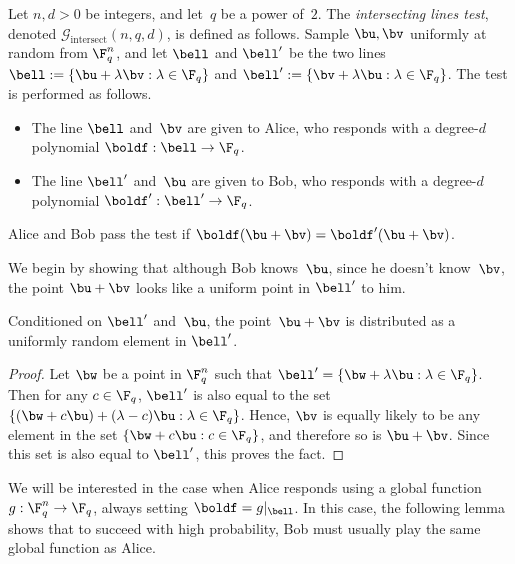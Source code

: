 \documentclass[11pt]{article}
\newcommand{\game}{\mathscr{G}}
\begin{document}
\begin{definition}
Let $n, d > 0$ be integers, and let~$q$ be a power of~$2$.
The \emph{intersecting lines test}, denoted $\game_{\mathrm{intersect}}(n, q, d)$, is defined as follows.
Sample $\bu, \bv$ uniformly at random from $\F_q^n$,
and let $\bell$ and $\bell'$ be the two lines
$\bell := \{\bu + \lambda \bv : \lambda \in \F_q\}$
and $\bell' := \{\bv + \lambda \bu : \lambda \in \F_q\}$.
The test is performed as follows.
\begin{itemize}
\itemsep -.5pt
\item[$\circ$] The line $\bell$ and~$\bv$ are given to Alice, who responds with a degree-$d$ polynomial $\boldf: \bell \rightarrow \F_q$.
\item[$\circ$] The line $\bell'$ and~$\bu$ are given to Bob, who responds with a degree-$d$ polynomial $\boldf':\bell' \rightarrow  \F_q$.
\end{itemize}
Alice and Bob pass the test if $\boldf(\bu + \bv) = \boldf'(\bu + \bv)$.
\end{definition}

We begin by showing that although Bob knows~$\bu$, since he doesn't know~$\bv$,
the point $\bu + \bv$ looks like a uniform point in $\bell'$ to him.

\begin{fact}\label{fact:easy-peasy-lemon-peasy}
Conditioned on $\bell'$ and~$\bu$, the point~$\bu+\bv$ is distributed as a uniformly random element in $\bell'$.
\end{fact}
\begin{proof}
Let $\bw$ be a point in $\F_q^n$ such that $\bell' = \{\bw + \lambda \bu : \lambda \in \F_q\}$. 
Then for any $c \in \F_q$, $\bell'$ is also equal to the set
$\{(\bw + c\bu) + (\lambda-c) \bu : \lambda \in \F_q\}$.
Hence, $\bv$ is equally likely to be any element in the set $\{\bw + c \bu : c \in \F_q\}$,
and therefore so is $\bu + \bv$.
Since this set is also equal to $\bell'$, this proves the fact.
\end{proof}

We will be interested in the case when Alice responds using a global function~$g:\F_q^n \rightarrow \F_q$,
always setting $\boldf = g|_{\bell}$.
In this case, the following lemma shows that to succeed with high probability,
Bob must usually play the same global function as Alice.
\end{document}
